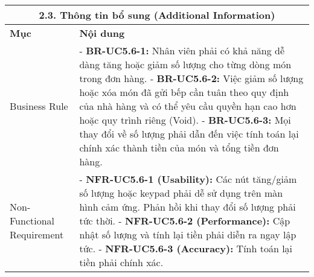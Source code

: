 \begin{longtable}{|m{4cm}|p{11cm}|}
\hline
\multicolumn{2}{|c|}{\textbf{2.3. Thông tin bổ sung (Additional Information)}} \\
\hline
\textbf{Mục} & \textbf{Nội dung} \\
\hline
Business Rule & - \textbf{BR-UC5.6-1:} Nhân viên phải có khả năng dễ dàng tăng hoặc giảm số lượng cho từng dòng món trong đơn hàng. \newline - \textbf{BR-UC5.6-2:} Việc giảm số lượng hoặc xóa món đã gửi bếp cần tuân theo quy định của nhà hàng và có thể yêu cầu quyền hạn cao hơn hoặc quy trình riêng (Void). \newline - \textbf{BR-UC5.6-3:} Mọi thay đổi về số lượng phải dẫn đến việc tính toán lại chính xác thành tiền của món và tổng tiền đơn hàng. \\
\hline
Non-Functional Requirement & - \textbf{NFR-UC5.6-1 (Usability):} Các nút tăng/giảm số lượng hoặc keypad phải dễ sử dụng trên màn hình cảm ứng. Phản hồi khi thay đổi số lượng phải tức thời. \newline - \textbf{NFR-UC5.6-2 (Performance):} Cập nhật số lượng và tính lại tiền phải diễn ra ngay lập tức. \newline - \textbf{NFR-UC5.6-3 (Accuracy):} Tính toán lại tiền phải chính xác. \\
\hline
\end{longtable}


